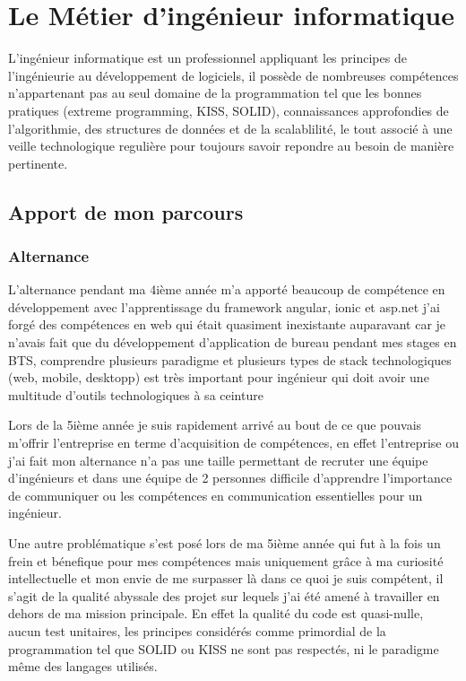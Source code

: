 \chapter{Le Métier d'ingénieur informatique}
L'ingénieur informatique est un professionnel appliquant les principes de l'ingénieurie au développement de logiciels,
il possède de nombreuses compétences n'appartenant pas au seul domaine de la programmation tel que les bonnes pratiques 
(extreme programming, KISS, SOLID), connaissances approfondies de l'algorithmie, des structures de données 
et de la scalablilité, le tout associé à une veille technologique regulière pour toujours savoir
repondre au besoin de manière pertinente.

\section{Apport de mon parcours}
\subsection{Alternance}
L'alternance pendant ma 4ième année m'a apporté beaucoup de compétence en développement avec l'apprentissage 
du framework angular, ionic et asp.net 
j'ai forgé des compétences en web qui était quasiment inexistante auparavant car je n'avais fait que 
du développement d'application de bureau pendant mes stages en BTS, comprendre plusieurs paradigme 
et plusieurs types de stack technologiques (web, mobile, desktopp) est très important pour ingénieur
qui doit avoir une multitude d'outils technologiques à sa ceinture \newline

Lors de la 5ième année je suis rapidement arrivé au bout de ce que pouvais m'offrir l'entreprise en  
terme d'acquisition de compétences, en effet l'entreprise ou j'ai fait mon alternance 
n'a pas une taille permettant de recruter une équipe d'ingénieurs et dans une équipe 
de 2 personnes difficile d'apprendre l'importance de communiquer ou les compétences en 
communication essentielles pour un ingénieur. \newline

Une autre problématique s'est posé lors de ma 5ième année qui fut à la fois un frein et bénefique pour 
mes compétences mais uniquement grâce à ma curiosité intellectuelle et mon envie de me surpasser là dans ce quoi 
je suis compétent, il s'agit de la qualité abyssale des projet sur lequels j'ai été amené à travailler 
en dehors de ma mission principale. En effet la qualité du code est quasi-nulle, aucun test unitaires, les principes 
considérés comme primordial de la programmation tel que SOLID ou KISS ne sont pas respectés, ni le paradigme 
même des langages utilisés. \newline

